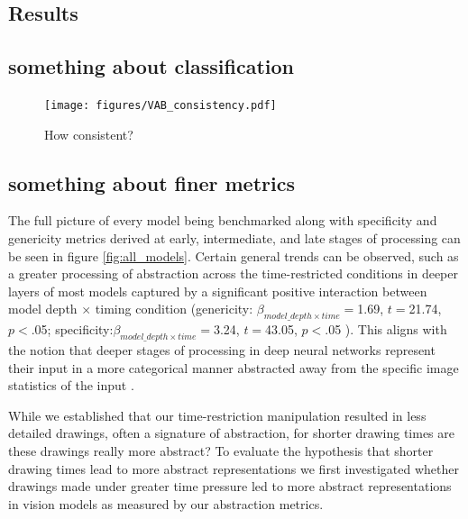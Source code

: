 \documentclass[10pt,letterpaper]{article}
\begin{document}


\subsection{Results}

\subsection{something about classification}

\begin{figure}
    \centering
    \texttt{[image: figures/VAB\_consistency.pdf]}
    \caption{How consistent?}
    \label{fig:consistency}
\end{figure}

\subsection{something about finer metrics}

The full picture of every model being benchmarked along with specificity and genericity metrics derived at early, intermediate, and late stages of processing can be seen in figure \ref{fig:all_models}. Certain general trends can be observed, such as a greater processing of abstraction across the time-restricted conditions in deeper layers of most models captured by a significant positive interaction between model depth $\times$ timing condition (genericity: $\beta_{model\_depth \times time} = $1.69, $t =$21.74, $p<$.05; specificity:$\beta_{model\_depth \times time} = $3.24, $t =$43.05, $p<$.05 ). This aligns with the notion that deeper stages of processing in deep neural networks represent their input in a more categorical manner abstracted away from the specific image statistics of the input \cite{yamins2014performance,khaligh2014deep,rajalingham2018large}. 

While we established that our time-restriction manipulation resulted in less detailed drawings, often a signature of abstraction, for shorter drawing times are these drawings really more abstract? 
To evaluate the hypothesis that shorter drawing times lead to more abstract representations we first investigated whether drawings made under greater time pressure led to more abstract representations in vision models as measured by our abstraction metrics.
\end{document}
